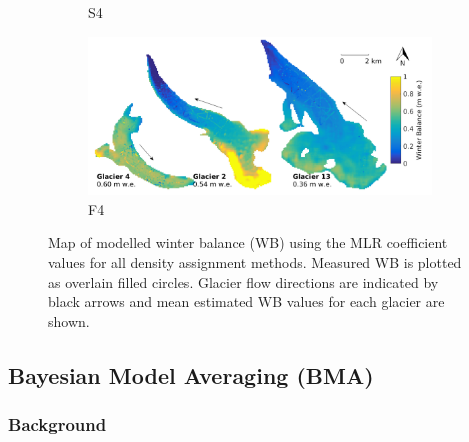 \documentclass{sfuthesis}
\begin{document}
\begin{figure}[H]
\begin{subfigure}[b]{0.475\textwidth}
            \caption[]%
            {{\small S4}}    
        \end{subfigure}
        \quad
        \begin{subfigure}[b]{0.475\textwidth}   
            \centering 
            \includegraphics[width=\textwidth]{MLRmap_Modelled_Observed8.png}
            \caption[]%
            {{\small F4}}    
        \end{subfigure}
        
        \caption[Map of modelled winter balance (WB) using the MLR coefficient values for all density assignment methods. Measured WB is plotted as overlain filled circles. Glacier flow directions are indicated by black arrows and mean estimated WB values for each glacier are shown.]
        {\small Map of modelled winter balance (WB) using the MLR coefficient values for all density assignment methods. Measured WB is plotted as overlain filled circles. Glacier flow directions are indicated by black arrows and mean estimated WB values for each glacier are shown.} 
        \label{fig:allMLRmodelled}
    \end{figure}
    



\subsection{Bayesian Model Averaging (BMA)}
\label{sec:BMS}

\subsubsection{Background}
\end{document}
